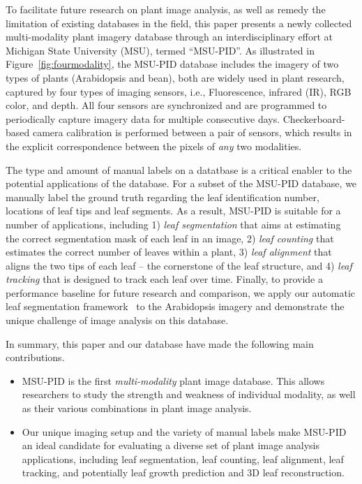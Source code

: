 To facilitate future research on plant image analysis, as well as remedy the limitation of existing databases in the field, this paper presents a newly collected multi-modality plant imagery database through an interdisciplinary effort at Michigan State University (MSU), termed ``MSU-PID''.
As illustrated in Figure~\ref{fig:fourmodality}, the MSU-PID database includes the imagery of two types of plants (Arabidopsis and bean), both are widely used in plant research, captured by four types of imaging sensors, i.e., Fluorescence, infrared (IR), RGB color, and depth.
All four sensors are synchronized and are programmed to periodically capture imagery data for multiple consecutive days.
Checkerboard-based camera calibration is performed between a pair of sensors, which results in the explicit correspondence between the pixels of {\it any} two modalities.

The type and amount of manual labels on a datatbase is a critical enabler to the potential applications of the database.
For a subset of the MSU-PID database, we manually label the ground truth regarding the leaf identification number, locations of leaf tips and leaf segments.
As a result,  MSU-PID is suitable for a number of applications, including 1) {\it leaf segmentation} that aims at estimating the correct segmentation mask of each leaf in an image, 2) {\it leaf counting} that estimates the correct number of leaves within a plant, 3) {\it leaf alignment} that aligns the two tips of each leaf -- the cornerstone of the leaf structure, and 4) {\it leaf tracking} that is designed to track each leaf over time.
Finally, to provide a performance baseline for future research and comparison, we apply our automatic leaf segmentation framework~\cite{yin2014a,yin2014b} to the Arabidopsis imagery and demonstrate the unique challenge of image analysis on this database.

In summary, this paper and our database have made the following main contributions.
\begin{itemize}
\item MSU-PID is the first {\it multi-modality} plant image database. This allows researchers to study the strength and weakness of individual modality, as well as their various combinations in plant image analysis.
\item Our unique imaging setup and the variety of manual labels make MSU-PID an ideal candidate for evaluating a diverse set of plant image analysis applications, including leaf segmentation, leaf counting, leaf alignment, leaf tracking, and potentially leaf growth prediction and $3$D leaf reconstruction.
\end{itemize}









